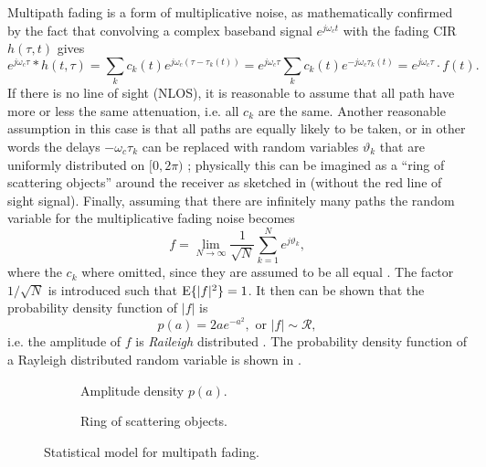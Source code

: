 Multipath fading is a form of multiplicative noise, as mathematically confirmed by the fact that convolving a complex baseband signal \(e^{j\omega_c t}\) with the fading CIR \(h(\tau, t)\) gives
\begin{equation}
	e^{j\omega_c \tau} * h(t, \tau) = \sum_k c_k(t) e^{j\omega_c(\tau - \tau_k(t))}
	= e^{j\omega_c \tau} \sum_k c_k(t) e^{-j\omega_c \tau_k(t)}
	= e^{j\omega_c \tau} \cdot f(t).
\end{equation}
If there is no line of sight (NLOS), it is reasonable to assume that all path have more or less the same attenuation, i.e. all \(c_k\) are the same. Another reasonable assumption in this case is that all paths are equally likely to be taken, or in other words the delays \(-\omega_c \tau_k\) can be replaced with random variables \(\vartheta_k\) that are uniformly distributed on \([0,2\pi)\) \cite{Hoher2013,Mathis}; physically this can be imagined as a ``ring of scattering objects'' around the receiver \cite{Messier} as sketched in  (without the red line of sight signal). Finally, assuming that there are infinitely many paths the random variable for the multiplicative fading noise becomes
\begin{equation} \label{eqn:mult-fading-nlos}
	f = \lim_{N\rightarrow\infty} \frac{1}{\sqrt{N}}
		\sum_{k=1}^{N} e^{j \vartheta_k },
\end{equation}
where the \(c_k\) where omitted, since they are assumed to be all equal \cite{Hoher2013}. The factor \(1/\sqrt{N}\) is introduced such that \(\operatorname{E} \{|f|^2\} = 1\). It then can be shown that the probability density function of \(|f|\) is
\begin{equation}
	p(a)= 2a e^{-a^2}, \text{ or } |f| \sim \mathcal{R},
\end{equation}
i.e. the amplitude of \(f\) is \emph{Raileigh} distributed \cite{Hoher2013}. The probability density function of a Rayleigh distributed random variable is shown in .

\begin{figure}
	\centering
	\hfill
	\begin{subfigure}[t]{.5\linewidth}
		
		\caption{
			Amplitude density \(p(a)\).
			\label{fig:rayleigh-rice-pdf}
		}
	\end{subfigure}
	\hfill
	\begin{subfigure}[t]{.45\linewidth}
		\centering
		\resizebox{!}{5cm}{%
			
		}
		\caption{
			Ring of scattering objects.
			\label{fig:ring-of-scattering-objects}
		}
	\end{subfigure}
	\hfill
	\caption{
		Statistical model for multipath fading.
		\label{fig:multipath-statistical-models}
	}
\end{figure}

